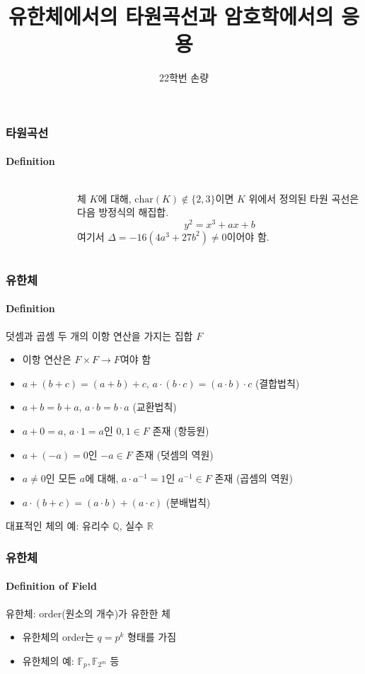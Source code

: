 \documentclass[aspectratio=169,mathserif]{beamer}
\title{유한체에서의 타원곡선과 암호학에서의 응용}
\author[Sohn]{22학번 손량}
\newcommand{\Fp}{\mathbb{F}_p}
\newcommand{\Ftwom}{\mathbb{F}_{2^m}}
\begin{document}
  \begin{frame}
    \titlepage
  \end{frame}

  \begin{frame}
    \frametitle{타원곡선}
    \framesubtitle{Definition}

    \begin{columns}
      \begin{figure}
        \centering
        \scalebox{0.5}{}
      \end{figure}
      체 \(K\)에 대해, \(\mathrm{char}(K)\not\in\{2,3\}\)이면 \(K\) 위에서 정의된 타원 곡선은 다음 방정식의 해집합.
      \[y^2 = x^3 + ax + b\]
      여기서 \(\Delta = -16(4a^3 + 27b^2) \not= 0\)이어야 함.
    \end{columns}
  \end{frame}

  \begin{frame}
    \frametitle{유한체}
    \framesubtitle{Definition}
    덧셈과 곱셈 두 개의 이항 연산을 가지는 집합 \(F\)
    \pause
    \begin{itemize}
      \item 이항 연산은 \(F\times F\to F\)여야 함
      \pause
      \item \(a+(b+c)=(a+b)+c,\,a\cdot(b\cdot c)=(a\cdot b)\cdot c\) (결합법칙)
      \item \(a+b=b+a,\,a\cdot b=b\cdot a\) (교환법칙)
      \item \(a+0=a,\,a\cdot 1=a\)인 \(0, 1\in F\) 존재 (항등원)
      \item \(a+(-a)=0\)인 \(-a\in F\) 존재 (덧셈의 역원)
      \item \(a\not=0\)인 모든 \(a\)에 대해, \(a\cdot a^{-1}=1\)인 \(a^{-1}\in F\) 존재 (곱셈의 역원)
      \item \(a\cdot(b+c)=(a\cdot b)+(a\cdot c)\) (분배법칙)
    \end{itemize}
    \pause
    대표적인 체의 예: 유리수 \(\mathbb{Q}\), 실수 \(\mathbb{R}\)
  \end{frame}

  \begin{frame}
    \frametitle{유한체}
    \framesubtitle{Definition of Field}

    유한체: order(원소의 개수)가 유한한 체
    \begin{itemize}
      \item 유한체의 order는 \(q=p^k\) 형태를 가짐
      \item 유한체의 예: \(\Fp, \Ftwom\) 등
    \end{itemize}
  \end{frame}
\end{document}

